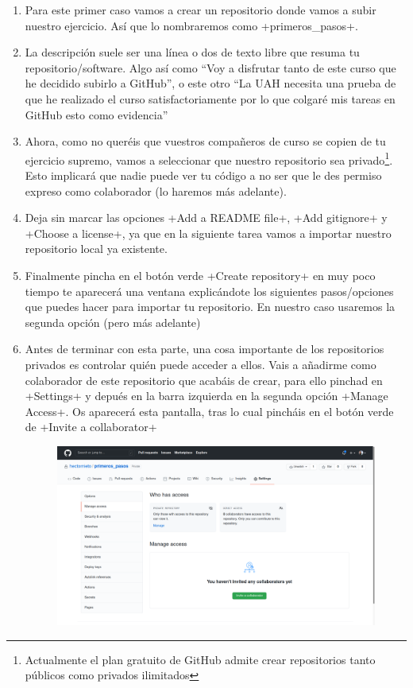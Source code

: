 \documentclass[a5paper, oneside,10pt]{article}
\begin{document}
\begin{enumerate}
       \item Para este primer caso vamos a crear un repositorio donde vamos a subir nuestro ejercicio. Así que lo nombraremos como \cverb+primeros_pasos+.
       
       \item La descripción suele ser una línea o dos de texto libre que resuma tu repositorio/software. Algo así como ``Voy a disfrutar tanto de este curso que he decidido subirlo a GitHub'', o este otro ``La UAH necesita una prueba de que he realizado el curso satisfactoriamente por lo que colgaré mis tareas en GitHub esto como evidencia''
       
       \item Ahora, como no queréis que vuestros compañeros de curso se copien de tu ejercicio supremo, vamos a seleccionar que nuestro repositorio sea privado\footnote{Actualmente el plan gratuito de GitHub admite crear repositorios tanto públicos como privados ilimitados}. Esto implicará que nadie puede ver tu código a no ser que le des permiso expreso como colaborador (lo haremos más adelante).
       
       \item Deja sin marcar las opciones \cverb+Add a README file+, \cverb+Add gitignore+ y \cverb+Choose a license+, ya que en la siguiente tarea vamos a importar nuestro repositorio local ya existente.
       
       \item Finalmente pincha en el botón verde \cverb+Create repository+ en muy poco tiempo te aparecerá una ventana explicándote los siguientes pasos/opciones que puedes hacer para importar tu repositorio. En nuestro caso usaremos la segunda opción (pero más adelante)
       
       \item Antes de terminar con esta parte, una cosa importante de los repositorios privados es controlar quién puede acceder a ellos. Vais a añadirme como colaborador de este repositorio que acabáis de crear, para ello pinchad en \cverb+Settings+ y depués en la barra izquierda en la segunda opción \cverb+Manage Access+. Os aparecerá esta pantalla, tras lo cual pincháis en el botón verde de \cverb+Invite a collaborator+

       \begin{figure}[H]\centering
        \hspace{-1cm}\includegraphics[width=1.2\columnwidth]{github_add_collaborator}
       \end{figure}
       

\end{enumerate}
\end{document}
